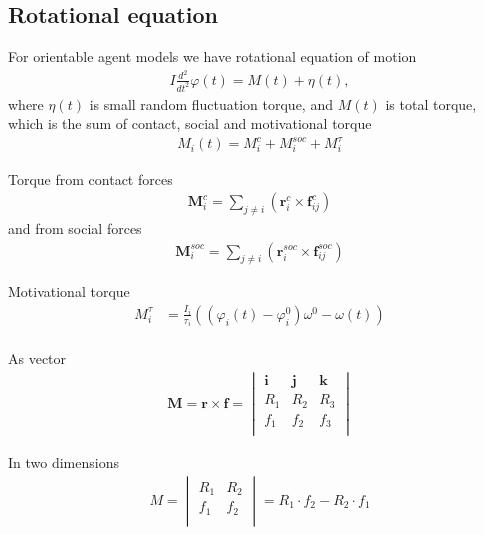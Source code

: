 \subsection{Rotational equation}

For orientable agent models we have rotational equation of motion
\begin{align}
I \frac{d^{2}}{d t^{2}} \varphi(t) = M(t) + \eta(t),
\end{align}
where $ \eta(t) $ is small random fluctuation torque, and $ M(t) $ is total torque, which is the sum of contact, social and motivational torque
\begin{align}
M_{i}(t) = M_{i}^{c} + M_{i}^{soc} + M_{i}^{\tau}
\end{align}

Torque from contact forces
\begin{align}
\mathbf{M}_{i}^{c} = \sum_{j\neq i}^{} \left(\mathbf{r}_{i}^{c} \times \mathbf{f}_{ij}^{c}\right)
\end{align}
and from social forces
\begin{align}
\mathbf{M}_{i}^{soc} = \sum_{j\neq i}^{} \left(\mathbf{r}_{i}^{soc} \times \mathbf{f}_{ij}^{soc}\right)
\end{align}

Motivational torque
\begin{align}
M_{i}^{\tau} &= \frac{I_{i}}{\tau_{i}} \left((\varphi_{i}(t) - \varphi_{i}^{0}) \omega^{0} - \omega(t)\right) \\
\end{align}

As vector
\begin{align}
\mathbf{M} = \mathbf{r} \times \mathbf{f} =  \begin{vmatrix} \mathbf{i} & \mathbf{j} & \mathbf{k} \\ R_{1} & R_{2} & R_{3} \\ f_{1} & f_{2} & f_{3} \\ \end{vmatrix} 
\end{align}

In two dimensions
\begin{align}
M = \begin{vmatrix} R_{1} & R_{2} \\ f_{1} & f_{2} \\ \end{vmatrix} = R_{1} \cdot f_{2} - R_{2} \cdot f_{1}
\end{align}
